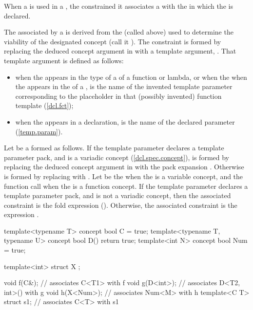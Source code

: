 When a 
is used in a ,
the constrained it associates a 
 with the
 in which the
 is declared.


\pnum
The  
associated by a 
is derived from the  
(called  above) used to determine the viability of
the designated concept (call it ).
% 
The constraint is formed by replacing the
deduced concept argument  in  with a 
template argument, . That template argument is
defined as follows:
% 
\begin{itemize}
\item when the 
appears in the type of a 
of a function or lambda, 
% 
or when the when the 
appears in the 
of a ,
% 
 is the name of the
invented template parameter corresponding to the 
placeholder in that (possibly invented) function template 
(\ref{dcl.fct});

\item when the 
appears in a 
declaration,  is the name of the declared
parameter (\ref{temp.param}). 
\end{itemize}
% 
Let  be a 
formed as follows. 
% 
If the template parameter  declares a template parameter 
pack, and  is a variadic concept 
(\ref{dcl.spec.concept}),
 is formed by replacing the deduced concept
argument  in 
 with the pack expansion .
% 
Otherwise  is formed by replacing 
with .
% 
Let  be the 
 when the  is a variable concept, and
the function call  when the  is a 
function concept.
% 
If the template parameter  declares a template
parameter pack, and  is not a variadic concept,
then the associated constraint is the fold expression 
().
% 
Otherwise, the associated constraint is the expression .
% 
\enterexample
\begin{codeblock}
template<typename T> concept bool C = true;
template<typename T, typename U> concept bool D() { return true; }
template<int N> concept bool Num = true;

template<int> struct X { };

void f(C&);              // associates C<T1> with f
void g(D<int>);          // associates D<T2, int>() with g
void h(X<Num>);          // associates Num<M> with h
template<C T> struct s1; // associates C<T> with s1
\end{codeblock}
